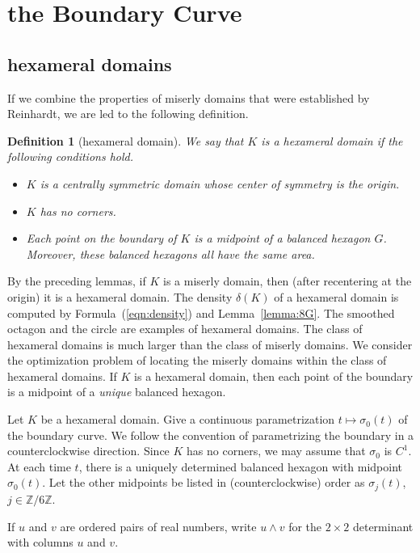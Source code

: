 \documentclass[11pt]{amsart}
\newtheorem{definition}[equation]{Definition}
\newcommand{\ring}[1]{\mathbb{#1}}
\def\deltalat{\mathbb\delta}  %
\def\rZ{{\ring{Z}}}
\begin{document}
\section{the Boundary Curve}


\subsection{hexameral domains}

If we combine the properties of miserly domains that were established
by Reinhardt, we are led to the following definition.

\begin{definition}[hexameral domain]
We say that $K$ is a hexameral domain if the following conditions hold.
\begin{itemize}
\item $K$ is a centrally symmetric domain whose center of symmetry is the origin.
\item $K$ has no corners.
\item Each point on
the boundary of $K$ is a midpoint of a balanced
hexagon $G$.  Moreover, these balanced hexagons all have the same area.
\end{itemize}
\end{definition}

By the preceding lemmas, if $K$ is a miserly domain, then (after
recentering at the origin) it is a hexameral domain.  The density
$\deltalat(K)$ of a hexameral domain is computed by
Formula~(\ref{eqn:density}) and Lemma~\ref{lemma:8G}.  The smoothed
octagon and the circle are examples of hexameral domains.  The class
of hexameral domains is much larger than the class of miserly domains.
We consider the optimization problem of locating the miserly domains
within the class of hexameral domains.  If $K$ is a hexameral domain,
then each point of the boundary is a midpoint of a {\it unique}
balanced hexagon.

Let $K$ be a hexameral domain.  Give a continuous parametrization
$t\mapsto\sigma_0(t)$ of the boundary curve.  We follow the convention
of parametrizing the boundary in a counterclockwise direction.  Since
$K$ has no corners, we may assume that $\sigma_0$ is $C^1$.  At each
time $t$, there is a uniquely determined balanced hexagon with
midpoint $\sigma_0(t)$. Let the other midpoints be listed in
(counterclockwise) order as $\sigma_j(t)$, $j\in\rZ/6\rZ$.

If $u$ and $v$ are ordered pairs of real numbers, write
$u\land v$ for the $2\times 2$ determinant with columns $u$ and $v$.
\end{document}

